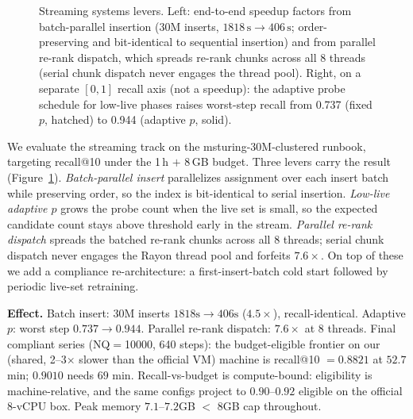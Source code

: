 \documentclass{article}
\newcommand{\effect}[1]{\par\smallskip\noindent\textbf{Effect.} #1}
\begin{document}
\begin{figure}[t]
  \caption{Streaming systems levers. Left: end-to-end speedup factors from
  batch-parallel insertion (30M inserts, $1818\,\mathrm{s} \to 406\,\mathrm{s}$;
  order-preserving and bit-identical to sequential insertion) and from
  parallel re-rank dispatch, which spreads re-rank chunks across all 8 threads
  (serial chunk dispatch never engages the thread pool). Right, on a separate $[0,1]$ recall axis (not a speedup):
  the adaptive probe schedule for low-live phases raises worst-step
  recall from 0.737 (fixed $p$, hatched) to 0.944 (adaptive $p$, solid).}
  \label{fig:stream}
\end{figure}

We evaluate the streaming track on the msturing-30M-clustered runbook, targeting
recall@10 under the 1\,h $+$ 8\,GB budget. Three levers carry the result (Figure~\ref{fig:stream}).
\emph{Batch-parallel insert} parallelizes assignment over each insert batch while
preserving order, so the index is bit-identical to serial insertion.
\emph{Low-live adaptive $p$} grows the probe count when the live set is small, so the
expected candidate count stays above threshold early in the stream. \emph{Parallel re-rank dispatch} spreads the batched re-rank chunks across all
8 threads; serial chunk dispatch never engages the Rayon thread pool and
forfeits $7.6\times$. On top of these we add a compliance
re-architecture: a first-insert-batch cold start followed by periodic live-set
retraining.
\effect{Batch insert: 30M inserts $1818\text{s}\to406\text{s}$ ($4.5\times$),
recall-identical. Adaptive $p$: worst step $0.737\to0.944$. Parallel re-rank dispatch:
$7.6\times$ at 8 threads. Final compliant series (NQ$=$10000, 640 steps): the
budget-eligible frontier on our (shared, 2--3$\times$ slower than the official
VM) machine is recall@10 $=0.8821$ at $52.7$ min; $0.9010$ needs $69$ min.
Recall-vs-budget is compute-bound: eligibility is machine-relative, and the
same configs project to $0.90$--$0.92$ eligible on the official 8-vCPU box.
Peak memory $7.1$--$7.2$GB $<$ 8GB cap throughout.}
\end{document}
